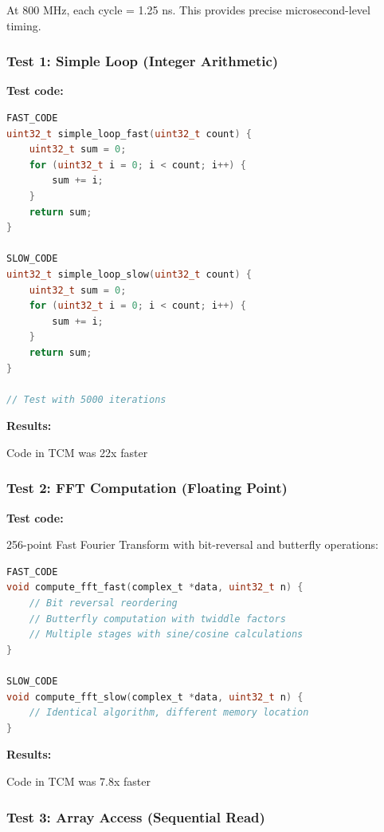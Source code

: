 \documentclass[12pt,a4paper]{report}
\begin{document}
At 800 MHz, each cycle = 1.25 ns. This provides precise microsecond-level timing.

\subsubsection{Test 1: Simple Loop (Integer Arithmetic)}

\textbf{Test code:}

\begin{lstlisting}[language=c]
FAST_CODE
uint32_t simple_loop_fast(uint32_t count) {
    uint32_t sum = 0;
    for (uint32_t i = 0; i < count; i++) {
        sum += i;
    }
    return sum;
}

SLOW_CODE
uint32_t simple_loop_slow(uint32_t count) {
    uint32_t sum = 0;
    for (uint32_t i = 0; i < count; i++) {
        sum += i;
    }
    return sum;
}

// Test with 5000 iterations
\end{lstlisting}

\textbf{Results:}
\begin{center}
Code in TCM  was 22x faster
\end{center}

\subsubsection{Test 2: FFT Computation (Floating Point)}

\textbf{Test code:}

256-point Fast Fourier Transform with bit-reversal and butterfly operations:

\begin{lstlisting}[language=c]
FAST_CODE
void compute_fft_fast(complex_t *data, uint32_t n) {
    // Bit reversal reordering
    // Butterfly computation with twiddle factors
    // Multiple stages with sine/cosine calculations
}

SLOW_CODE
void compute_fft_slow(complex_t *data, uint32_t n) {
    // Identical algorithm, different memory location
}
\end{lstlisting}

\textbf{Results:}
\begin{center}
Code in TCM  was 7.8x faster
\end{center}

\subsubsection{Test 3: Array Access (Sequential Read)}
\end{document}
